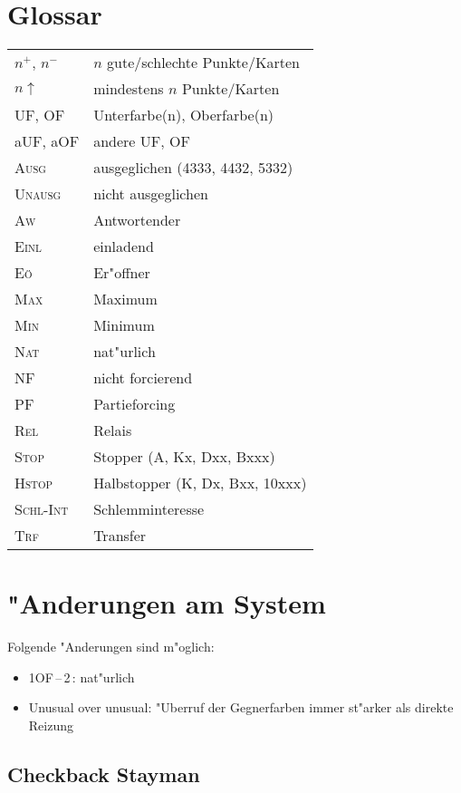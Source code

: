 \documentclass[11pt,german,twocolumn]{scrartcl}
\renewcommand{\Cl}{{\color{ClColor}{\clubs}}}
\def\tre{\,\Cl}
\def\good{$^+$}
\def\bad{$^-$}
\def\pl{$\uparrow$}
\def\ufa{\textsf{UF}}
\def\aufa{\textsf{aUF}}
\def\ofa{\textsf{OF}}
\def\aofa{\textsf{aOF}}
\def\sep{\,--\,}
\def\bal{\textsc{Ausg}}
\def\unbal{\textsc{Unausg}}
\def\nat{\textsc{Nat}}
\def\pf{\textsc{PF}}
\def\maxi{\textsc{Max}}
\def\mini{\textsc{Min}}
\def\inv{\textsc{Einl}}
\def\nf{\textsc{NF}}
\def\rel{\textsc{Rel}}
\def\stp{\textsc{Stop}}
\def\hstp{\textsc{Hstop}}
\def\aw{\textsc{Aw}}
\def\eo{\textsc{E\"o}}
\def\xfer{\textsc{Trf}}
\def\slamint{\textsc{Schl-Int}}
\begin{document}
\begin{appendix}

\section{Glossar}

\begin{flushleft}
\begin{tabularx}{\columnwidth}{lX}%
$n$\good, $n$\bad & $n$ gute/schlechte Punkte/Karten \\
$n$\pl & mindestens $n$ Punkte/Karten \\
\ufa, \ofa & Unterfarbe(n), Oberfarbe(n) \\
\aufa, \aofa & andere \ufa, \ofa\\
\bal & ausgeglichen (4333, 4432, 5332)\\
\unbal & nicht ausgeglichen \\
\aw & Antwortender \\
\inv & einladend \\
\eo & Er"offner \\
\maxi & Maximum \\
\mini & Minimum \\
\nat & nat"urlich \\
\nf & nicht forcierend \\
\pf & Partieforcing \\
\rel & Relais \\
\stp & Stopper (A, Kx, Dxx, Bxxx) \\
\hstp & Halbstopper (K, Dx, Bxx, 10xxx) \\
\slamint & Schlemminteresse \\
\xfer & Transfer \\
\end{tabularx}%
\end{flushleft}

\section{"Anderungen am System}

Folgende "Anderungen sind m"oglich:
%
\begin{itemize}
\item 1\ofa\sep2\tre: nat"urlich
\item Unusual over unusual: "Uberruf der Gegnerfarben immer st"arker als direkte Reizung
\end{itemize}

\subsection{Checkback Stayman}


\end{appendix}
\end{document}
